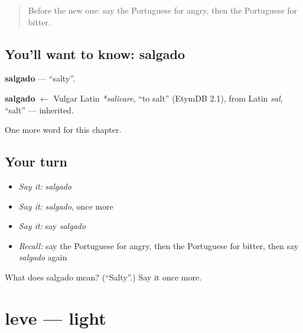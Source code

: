 \label{lesson:PT-C127-salgado}



\begin{quote}
Before the new one: say the Portuguese for angry, then the Portuguese for bitter.
\end{quote}

\subsection*{You'll want to know: salgado}
\textbf{salgado} — \textquotedblleft{}salty\textquotedblright{}.

\begin{cousinweb}
\textbf{salgado} $\leftarrow$ Vulgar Latin \emph{*salicare}, \textquotedblleft{}to salt\textquotedblright{} (EtymDB 2.1), from Latin \emph{sal}, \textquotedblleft{}salt\textquotedblright{} — inherited.
\end{cousinweb}

\begin{grammarlens}[title={What you've built}]
One more word for this chapter.
\end{grammarlens}

\subsection*{Your turn}
\begin{itemize}
\raggedright
  \item \emph{Say it:} \emph{salgado}
  \item \emph{Say it:} \emph{salgado}, once more
  \item \emph{Say it:} say \emph{salgado}
  \item \emph{Recall:} say the Portuguese for angry, then the Portuguese for bitter, then say \emph{salgado} again
\end{itemize}

\begin{tcolorbox}[breakable,colback=teal!4,colframe=teal!35!black,title={Before you move on}]
What does salgado mean? (\textquotedblleft{}Salty\textquotedblright{}.) Say it once more.
\end{tcolorbox}
\section[leve]{leve — light}

\label{lesson:PT-C127-leve}



